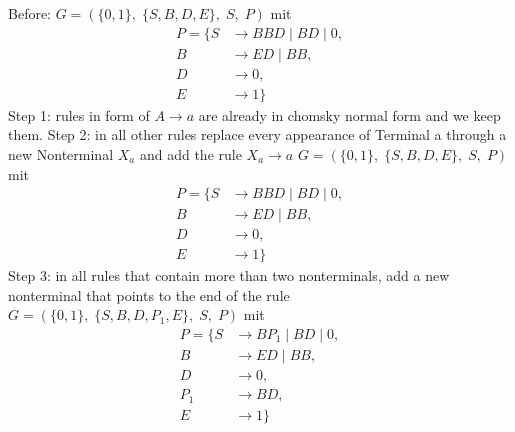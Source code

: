\documentclass{article}
\begin{document}
Before:
$G=\left(\{0, 1\},\;\{ S, B, D, E\},\;S,\;P\right)$ mit
\begin{align*}
P=\{	S &\rightarrow BBD\;|\;BD\;|\;0, \\ 
	B &\rightarrow ED\;|\;BB, \\ 
	D &\rightarrow 0, \\ 
	E &\rightarrow 1\}
\end{align*}
Step 1: rules in form of $A \rightarrow a$ are already in chomsky normal form and we keep them.
Step 2: in all other rules replace every appearance of Terminal a through a new Nonterminal $X_a$ and add the rule $X_a \rightarrow a$
$G=\left(\{0, 1\},\;\{ S, B, D, E\},\;S,\;P\right)$ mit
\begin{align*}
P=\{	S &\rightarrow BBD\;|\;BD\;|\;0, \\ 
	B &\rightarrow ED\;|\;BB, \\ 
	D &\rightarrow 0, \\ 
	E &\rightarrow 1\}
\end{align*}
Step 3: in all rules that contain more than two nonterminals, add a new nonterminal that points to the end of the rule
$G=\left(\{0, 1\},\;\{ S, B, D, P_1, E\},\;S,\;P\right)$ mit
\begin{align*}
P=\{	S &\rightarrow BP_1\;|\;BD\;|\;0, \\ 
	B &\rightarrow ED\;|\;BB, \\ 
	D &\rightarrow 0, \\ 
	P_1 &\rightarrow BD, \\ 
	E &\rightarrow 1\}
\end{align*}
\end{document}
